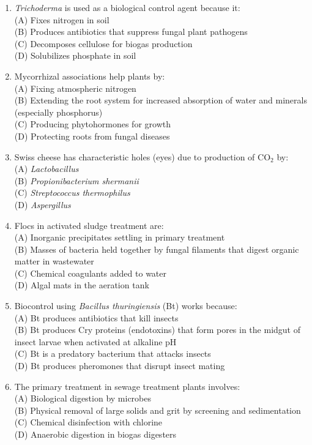 \documentclass{article}
\begin{document}
\begin{enumerate}[label=Q\arabic*.]
\item \textit{Trichoderma} is used as a biological control agent because it:
\\(A) Fixes nitrogen in soil
\\(B) Produces antibiotics that suppress fungal plant pathogens
\\(C) Decomposes cellulose for biogas production
\\(D) Solubilizes phosphate in soil

\item Mycorrhizal associations help plants by:
\\(A) Fixing atmospheric nitrogen
\\(B) Extending the root system for increased absorption of water and minerals (especially phosphorus)
\\(C) Producing phytohormones for growth
\\(D) Protecting roots from fungal diseases

\item Swiss cheese has characteristic holes (eyes) due to production of CO$_2$ by:
\\(A) \textit{Lactobacillus}
\\(B) \textit{Propionibacterium shermanii}
\\(C) \textit{Streptococcus thermophilus}
\\(D) \textit{Aspergillus}

\item Flocs in activated sludge treatment are:
\\(A) Inorganic precipitates settling in primary treatment
\\(B) Masses of bacteria held together by fungal filaments that digest organic matter in wastewater
\\(C) Chemical coagulants added to water
\\(D) Algal mats in the aeration tank

\item Biocontrol using \textit{Bacillus thuringiensis} (Bt) works because:
\\(A) Bt produces antibiotics that kill insects
\\(B) Bt produces Cry proteins (endotoxins) that form pores in the midgut of insect larvae when activated at alkaline pH
\\(C) Bt is a predatory bacterium that attacks insects
\\(D) Bt produces pheromones that disrupt insect mating

\item The primary treatment in sewage treatment plants involves:
\\(A) Biological digestion by microbes
\\(B) Physical removal of large solids and grit by screening and sedimentation
\\(C) Chemical disinfection with chlorine
\\(D) Anaerobic digestion in biogas digesters


\end{enumerate}
\end{document}
